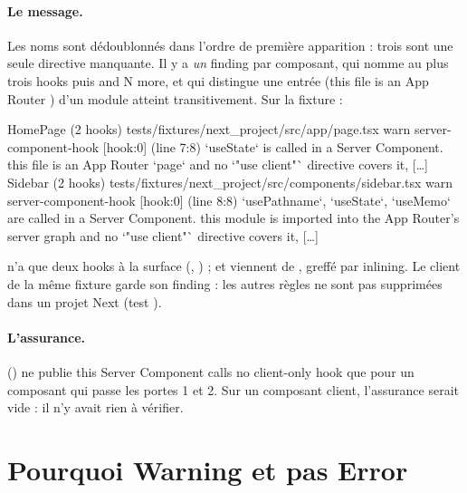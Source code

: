 \paragraph{Le message.} Les noms sont dédoublonnés dans l'ordre de première apparition : trois
 sont une seule directive manquante. Il y a \emph{un} finding par composant, qui
nomme au plus trois hooks puis \og and N more\fg{}, et qui distingue une entrée
(\og this file is an App Router \fg{}) d'un module atteint transitivement. Sur la
fixture  :
\begin{sortie}
  HomePage  (2 hooks)  tests/fixtures/next_project/src/app/page.tsx
    warn   server-component-hook  [hook:0]  (line 7:8)  `useState` is called in a Server Component.
      this file is an App Router `page` and no `"use client"` directive covers it, […]
  Sidebar  (2 hooks)  tests/fixtures/next_project/src/components/sidebar.tsx
    warn   server-component-hook  [hook:0]  (line 8:8)  `usePathname`, `useState`, `useMemo` are
      called in a Server Component. this module is imported into the App Router's server graph
      and no `"use client"` directive covers it, […]
\end{sortie}
 n'a que deux hooks à la surface (, ) ;
 et  viennent de , greffé par inlining. Le
 client de la même fixture garde son finding  : les autres
règles ne sont pas supprimées dans un projet Next (test ).

\paragraph{L'assurance.}  ()
ne publie \og this Server Component calls no client-only hook\fg{} que pour un composant qui passe
les portes 1 et 2. Sur un composant client, l'assurance serait vide : il n'y avait rien à
vérifier.

\section{Pourquoi Warning et pas Error}
\label{sec:regles-rendu-rsc-niveau}

